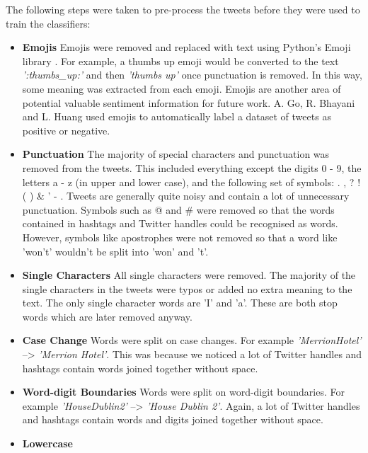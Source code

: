 The following steps were taken to pre-process the tweets before they were used to train the classifiers:\newline
\begin{itemize}
    \item \textbf{Emojis}\newline
    Emojis were removed and replaced with text using Python's Emoji library \cite{emoji}. For example, a thumbs up emoji would be converted to the text \emph{':thumbs\_up:'} and then \emph{'thumbs up'} once punctuation is removed. In this way, some meaning was extracted from each emoji. Emojis are another area of potential valuable sentiment information for future work. A. Go, R. Bhayani and L. Huang \cite{Go2009} used emojis to automatically label a dataset of tweets as positive or negative.
    \item \textbf{Punctuation}\newline
    The majority of special characters and punctuation was removed from the tweets. This included everything except the digits 0 - 9, the letters a - z (in upper and lower case), and the following set of symbols: . , ? ! ( ) \& ' - . Tweets are generally quite noisy and contain a lot of unnecessary punctuation. Symbols such as @ and \# were removed so that the words contained in hashtags and Twitter handles could be recognised as words. However, symbols like apostrophes were not removed so that a word like 'won't' wouldn't be split into 'won' and 't'.
    \item \textbf{Single Characters}\newline
    All single characters were removed. The majority of the single characters in the tweets were typos or added no extra meaning to the text. The only single character words are 'I' and 'a'. These are both stop words which are later removed anyway.
    \item \textbf{Case Change}\newline
    Words were split on case changes. For example \emph{'MerrionHotel'} --> \emph{'Merrion Hotel'}. This was because we noticed a lot of Twitter handles and hashtags contain words joined together without space. 
    \item \textbf{Word-digit Boundaries}\newline
    Words were split on word-digit boundaries. For example \emph{'HouseDublin2'} --> \emph{'House Dublin 2'}. Again, a lot of Twitter handles and hashtags contain words and digits joined together without space. 
    \item \textbf{Lowercase}\newline

\end{itemize}
